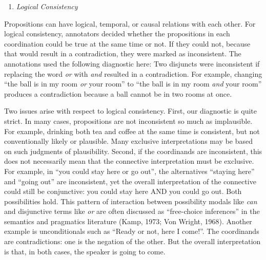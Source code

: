 \documentclass[
  ,man,floatsintext]{apa6}
\providecommand{\tightlist}{%
  \setlength{\itemsep}{0pt}\setlength{\parskip}{0pt}}
\begin{document}
\begin{enumerate}
\def\labelenumi{\arabic{enumi}.}
\setcounter{enumi}{1}
\tightlist
\item
  \emph{Logical Consistency}
\end{enumerate}

Propositions can have logical, temporal, or causal relations with each other. For logical consistency, annotators decided whether the propositions in each coordination could be true at the same time or not. If they could not, because that would result in a contradiction, they were marked as inconsistent. The annotations used the following diagnostic here: Two disjuncts were inconsistent if replacing the word \emph{or} with \emph{and} resulted in a contradiction. For example, changing ``the ball is in my room \emph{or} your room'' to ``the ball is in my room \emph{and} your room'' produces a contradiction because a ball cannot be in two rooms at once.

Two issues arise with respect to logical consistency. First, our diagnostic is quite strict. In many cases, propositions are not inconsistent so much as implausible. For example, drinking both tea and coffee at the same time is consistent, but not conventionally likely or plausible. Many exclusive interpretations may be based on such judgments of plausibility. Second, if the coordinands are inconsistent, this does not necessarily mean that the connective interpretation must be exclusive. For example, in ``you could stay here or go out'', the alternatives ``staying here'' and ``going out'' are inconsistent, yet the overall interpretation of the connective could still be conjunctive: you could stay here AND you could go out. Both possibilities hold. This pattern of interaction between possibility modals like \emph{can} and disjunctive terms like \emph{or} are often discussed as ``free-choice inferences'' in the semantics and pragmatics literature (Kamp, 1973; Von Wright, 1968). Another example is unconditionals such as ``Ready or not, here I come!''. The coordinands are contradictions: one is the negation of the other. But the overall interpretation is that, in both cases, the speaker is going to come.
\end{document}
